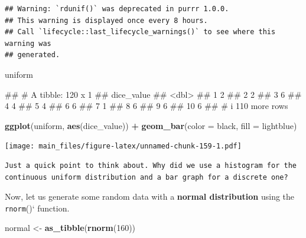 \documentclass[
]{book}
\newenvironment{Shaded}{\begin{snugshade}}{\end{snugshade}}
\newcommand{\AttributeTok}[1]{\textcolor[rgb]{0.13,0.29,0.53}{#1}}
\newcommand{\DecValTok}[1]{\textcolor[rgb]{0.00,0.00,0.81}{#1}}
\newcommand{\FunctionTok}[1]{\textcolor[rgb]{0.13,0.29,0.53}{\textbf{#1}}}
\newcommand{\NormalTok}[1]{#1}
\newcommand{\OtherTok}[1]{\textcolor[rgb]{0.56,0.35,0.01}{#1}}
\newcommand{\SpecialCharTok}[1]{\textcolor[rgb]{0.81,0.36,0.00}{\textbf{#1}}}
\newcommand{\StringTok}[1]{\textcolor[rgb]{0.31,0.60,0.02}{#1}}
\begin{document}
\begin{verbatim}
## Warning: `rdunif()` was deprecated in purrr 1.0.0.
## This warning is displayed once every 8 hours.
## Call `lifecycle::last_lifecycle_warnings()` to see where this warning was
## generated.
\end{verbatim}

\begin{Shaded}
\begin{Highlighting}[]
\NormalTok{uniform}
\end{Highlighting}
\end{Shaded}

\begin{Shaded}
\begin{Highlighting}[]
\NormalTok{\#\# \# A tibble: 120 x 1}
\NormalTok{\#\#    dice\_value}
\NormalTok{\#\#         \textless{}dbl\textgreater{}}
\NormalTok{\#\#  1          2}
\NormalTok{\#\#  2          2}
\NormalTok{\#\#  3          6}
\NormalTok{\#\#  4          4}
\NormalTok{\#\#  5          4}
\NormalTok{\#\#  6          6}
\NormalTok{\#\#  7          1}
\NormalTok{\#\#  8          6}
\NormalTok{\#\#  9          6}
\NormalTok{\#\# 10          6}
\NormalTok{\#\# \# i 110 more rows}
\end{Highlighting}
\end{Shaded}

\begin{Shaded}
\begin{Highlighting}[]
\FunctionTok{ggplot}\NormalTok{(uniform, }\FunctionTok{aes}\NormalTok{(dice\_value)) }\SpecialCharTok{+}
  \FunctionTok{geom\_bar}\NormalTok{(}\AttributeTok{color =} \StringTok{\textquotesingle{}black\textquotesingle{}}\NormalTok{,}
           \AttributeTok{fill =} \StringTok{\textquotesingle{}lightblue\textquotesingle{}}\NormalTok{)}
\end{Highlighting}
\end{Shaded}

\texttt{[image: main\_files/figure-latex/unnamed-chunk-159-1.pdf]}

\begin{verbatim}
Just a quick point to think about. Why did we use a histogram for the 
continuous uniform distribution and a bar graph for a discrete one? 
\end{verbatim}

Now, let us generate some random data with a \textbf{normal distribution} using the \texttt{rnorm}()` function.

\begin{Shaded}
\begin{Highlighting}[]
\NormalTok{normal }\OtherTok{\textless{}{-}} \FunctionTok{as\_tibble}\NormalTok{(}\FunctionTok{rnorm}\NormalTok{(}\DecValTok{160}\NormalTok{))}
\end{Highlighting}
\end{Shaded}
\end{document}
